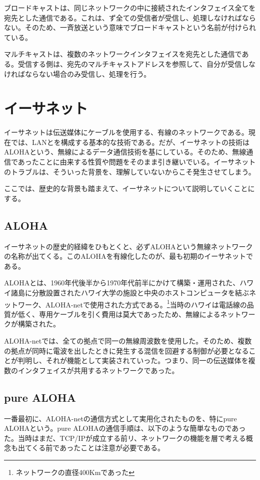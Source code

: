 ブロードキャストは、同じネットワークの中に接続されたインタフェイス全てを宛先とした通信である。これは、ず全ての受信者が受信し、処理しなければならない。そのため、一斉放送という意味でブロードキャストという名前が付けられている。

マルチキャストは、複数のネットワークインタフェイスを宛先とした通信である。受信する側は、宛先のマルチキャストアドレスを参照して、自分が受信しなければならない場合のみ受信し、処理を行う。

\section{イーサネット}

イーサネットは伝送媒体にケーブルを使用する、有線のネットワークである。現在では、LANとを構成する基本的な技術である。だが、イーサネットの技術はALOHAという、無線によるデータ通信技術を基にしている。そのため、無線通信であったことに由来する性質や問題をそのまま引き継いでいる。イーサネットのトラブルは、そういった背景を、理解していないからこそ発生させてしまう。

ここでは、歴史的な背景も踏まえて、イーサネットについて説明していくことにする。



\subsection{ALOHA}

イーサネットの歴史的経緯をひもとくと、必ずALOHAという無線ネットワークの名称が出てくる。このALOHAを有線化したのが、最も初期のイーサネットである。

ALOHAとは、1960年代後半から1970年代前半にかけて構築・運用された、ハワイ諸島に分散設置されたハワイ大学の施設と中央のホストコンピュータを結ぶネットワーク、ALOHA-netで使用された方式である。\footnote{ネットワークの直径400Kmであった}当時のハワイは電話線の品質が低く、専用ケーブルを引く費用は莫大であったため、無線によるネットワークが構築された。

ALOHA-netでは、全ての拠点で同一の無線周波数を使用した。そのため、複数の拠点が同時に電波を出したときに発生する混信を回避する制御が必要となることが判明し、それが機能として実装されていった。つまり、同一の伝送媒体を複数のインタフェイスが共用するネットワークであった。

\subsection{pure ALOHA}

一番最初に、ALOHA-netの通信方式として実用化されたものを、特にpure ALOHAという。pure ALOHAの通信手順は、以下のような簡単なものであった。当時はまだ、TCP/IPが成立する前リ、ネットワークの機能を層で考える概念も出てくる前であったことは注意が必要である。

